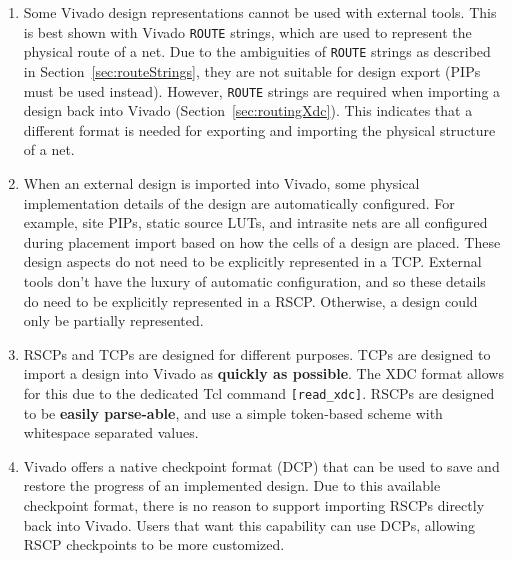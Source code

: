 \begin{enumerate}
  \item Some Vivado design representations cannot be used with
  external tools. This is best shown with Vivado \texttt{ROUTE} strings, which
  are used to represent the physical route of a net. Due to the ambiguities of
  \texttt{ROUTE} strings as described in Section~\ref{sec:routeStrings}, they are
  not suitable for design export (PIPs must be used instead). However,
  \texttt{ROUTE} strings are required when importing a design back into Vivado
  (Section~\ref{sec:routingXdc}). This indicates that a different format is needed
  for exporting and importing the physical structure of a net.
     
  \item When an external design is imported into Vivado, some physical
  implementation details of the design are automatically configured. 
  For example, site PIPs, static source LUTs, and intrasite nets are all
  configured during placement import based on how the cells of a design are
  placed. These design aspects do not need to be explicitly represented in a
  TCP. External tools don't have the luxury of automatic configuration, and so
  these details do need to be explicitly represented in a RSCP. Otherwise, a
  design could only be partially represented.
    
  \item RSCPs and TCPs are designed for different purposes. TCPs are
  designed to import a design into Vivado as \textbf{quickly as possible}. The
  XDC format allows for this due to the dedicated Tcl command
  \texttt{[read\_xdc]}. RSCPs are designed to be \textbf{easily parse-able}, and
  use a simple token-based scheme with whitespace separated values.
  
  \item Vivado offers a native checkpoint format (DCP) that can be used to save
  and restore the progress of an implemented design. Due to this available
  checkpoint format, there is no reason to support importing RSCPs directly back
  into Vivado. Users that want this capability can use DCPs, allowing RSCP
  checkpoints to be more customized.
  
\end{enumerate}